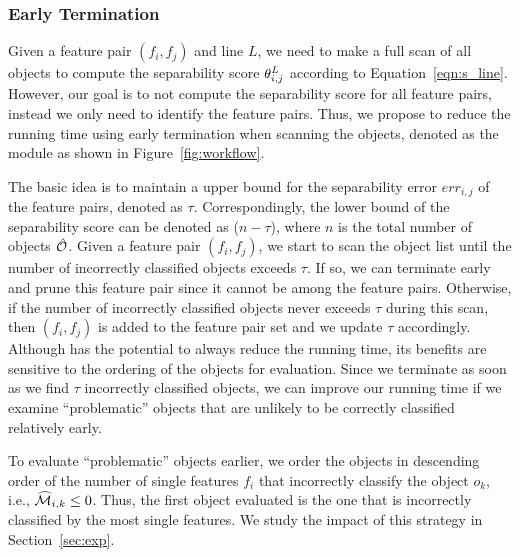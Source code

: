 \subsubsection{Early Termination} \label{ssec:earlyT}

Given a feature pair $(f_i,f_j)$ and line $L$, we need to make a full scan of all objects to compute the separability score $\theta_{i,j}^{\mathit{L}}$ according to Equation~\ref{eqn:s_line}. However, our goal is to not compute the separability score for all feature pairs, instead we only need to identify the \topk feature pairs. Thus, we propose to reduce the running time using early termination when scanning the objects, denoted as the \earlyT module as shown in Figure~\ref{fig:workflow}.

 The basic idea is to maintain a upper bound for the separability error $err_{i,j}$ of the \topk feature pairs, denoted as $\tau$. Correspondingly, the lower bound of the separability score can be denoted as ($n-\tau$), where $n$ is the total number of objects $\hat{{\mathcal{O}}}$. Given a feature pair $(f_i,f_j)$, we start to scan the object list until the number of incorrectly classified objects exceeds $\tau$. If so, we can terminate early and prune this feature pair since it cannot be among the \topk feature pairs. Otherwise, if the number of incorrectly classified objects never exceeds $\tau$ during this scan, then $(f_i,f_j)$ is added to the \topk feature pair set and we update $\tau$ accordingly. Although \earlyT has the potential to always reduce the running time, its benefits are sensitive to the ordering of the objects for evaluation. Since we terminate as soon as we find $\tau$ incorrectly classified objects, we can improve our running time if we examine ``problematic'' objects that are unlikely to be correctly classified relatively early.

 To evaluate ``problematic'' objects earlier, we order the objects in descending order of the number of single features $f_i$ that incorrectly classify the object $o_k$, i.e., $\widehat{{\mathcal{M}}}_{i,k}\leq0$. Thus, the first object evaluated is the one that is incorrectly classified by the most single features. We study the impact of this strategy in Section~\ref{sec:exp}.

